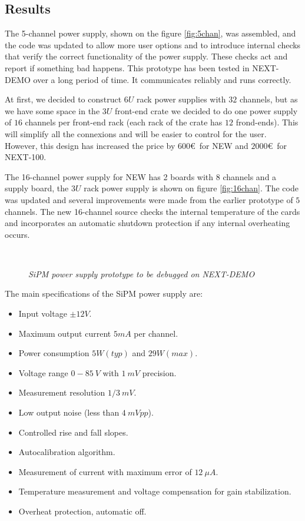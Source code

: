 \subsection{Results}
The 5-channel power supply, shown on the figure \ref{fig:5chan}, was assembled, and the code was updated to allow more user options and to introduce internal checks that verify the correct functionality of the power supply. These checks act and report if something bad happens. This prototype has been tested in NEXT-DEMO over a long period of time. It communicates reliably and runs correctly.

At first, we decided to construct $6U$ rack power supplies with $32$ channels, but as we have some space in the $3U$ front-end crate we decided to do one power supply of $16$ channels per front-end rack (each rack of the crate has $12$ frond-ends). This will simplify all the connexions and will be easier to control for the user. However, this design has  increased the price by $600$\euro\ for NEW and $2000$\euro\ for NEXT-100.

The 16-channel power supply for NEW has 2 boards with 8 channels and a supply board, the $3U$ rack power supply is shown on figure \ref{fig:16chan}. The code was updated and several improvements were made from the earlier prototype of $5$ channels. The new 16-channel source checks the internal temperature of the cards and incorporates an automatic shutdown protection if any internal overheating occurs. 

\begin{figure}[ht]
\centering
{} 
\hspace{15mm}
 \\
\caption{\textit{SiPM power supply prototype to be debugged on NEXT-DEMO}}
\end{figure}

The main specifications of the SiPM power supply are:

\begin{itemize}

\item Input voltage $\pm 12V$.
\item Maximum output current $5mA$ per channel.
\item Power consumption $5W (typ)$ and $29W (max)$.
\item Voltage range $0-85\ V$ with $1\ mV$ precision.
\item Measurement resolution $1/3\ mV$.
\item Low output noise (less than $4\ mVpp$).
\item Controlled rise and fall slopes.
\item Autocalibration algorithm.
\item Measurement of current with maximum error of $12\ \mu A$.
\item Temperature measurement and voltage compensation for gain stabilization.
\item Overheat protection, automatic off.
\end{itemize}

